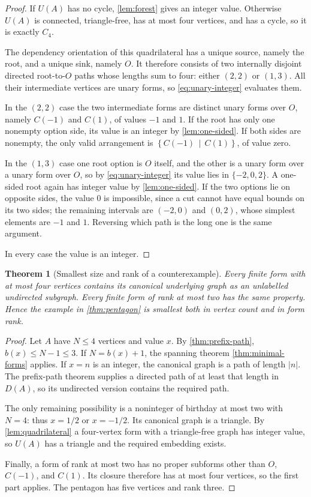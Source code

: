\documentclass[11pt,a4paper]{article}
\numberwithin{equation}{section}
\newtheorem{theorem}{Theorem}[section]
\theoremstyle{definition}
\theoremstyle{remark}
\newcommand{\cut}[2]{\left\{#1\,\middle|\,#2\right\}}
\newcommand{\can}{C}
\begin{document}
\begin{proof}
If $U(A)$ has no cycle, \cref{lem:forest} gives an integer value. Otherwise
$U(A)$ is connected, triangle-free, has at most four vertices, and has a cycle,
so it is exactly $C_4$.

The dependency orientation of this quadrilateral has a unique source, namely the
root, and a unique sink, namely $O$. It therefore consists of two internally
disjoint directed root-to-$O$ paths whose lengths sum to four: either $(2,2)$ or
$(1,3)$. All their intermediate vertices are unary forms, so
\eqref{eq:unary-integer} evaluates them.

In the $(2,2)$ case the two intermediate forms are distinct unary forms over
$O$, namely $\can(-1)$ and $\can(1)$, of values $-1$ and $1$. If the root has
only one nonempty option side, its value is an integer by \cref{lem:one-sided}.
If both sides are nonempty, the only valid arrangement is
$\cut{\can(-1)}{\can(1)}$, of value zero.

In the $(1,3)$ case one root option is $O$ itself, and the other is a unary form
over a unary form over $O$, so by \eqref{eq:unary-integer} its value lies in
$\{-2,0,2\}$. A one-sided root again has integer value by
\cref{lem:one-sided}. If the two options lie on opposite sides, the value $0$ is
impossible, since a cut cannot have equal bounds on its two sides; the remaining
intervals are $(-2,0)$ and $(0,2)$, whose simplest elements are $-1$ and $1$.
Reversing which path is the long one is the same argument.

In every case the value is an integer.
\end{proof}

\begin{theorem}[Smallest size and rank of a counterexample]
\label{thm:smallest}
Every finite form with at most four vertices contains its canonical underlying
graph as an unlabelled undirected subgraph. Every finite form of rank at most
two has the same property. Hence the example in \cref{thm:pentagon} is smallest
both in vertex count and in form rank.
\end{theorem}

\begin{proof}
Let $A$ have $N\leq4$ vertices and value $x$. By \cref{thm:prefix-path},
$b(x)\leq N-1\leq3$. If $N=b(x)+1$, the spanning theorem
\ref{thm:minimal-forms} applies. If $x=n$ is an integer, the canonical graph
is a path of length $|n|$. The prefix-path theorem supplies a directed path
of at least that length in $D(A)$, so its undirected version contains the
required path.

The only remaining possibility is a noninteger of birthday at most two with
$N=4$: thus $x=1/2$ or $x=-1/2$. Its canonical graph is a triangle. By
\cref{lem:quadrilateral} a four-vertex form with a triangle-free graph has
integer value, so $U(A)$ has a triangle and the required embedding exists.

Finally, a form of rank at most two has no proper subforms other than $O$,
$\can(-1)$, and $\can(1)$. Its closure therefore has at most four vertices,
so the first part applies. The pentagon has five vertices and rank three.
\end{proof}
\end{document}
